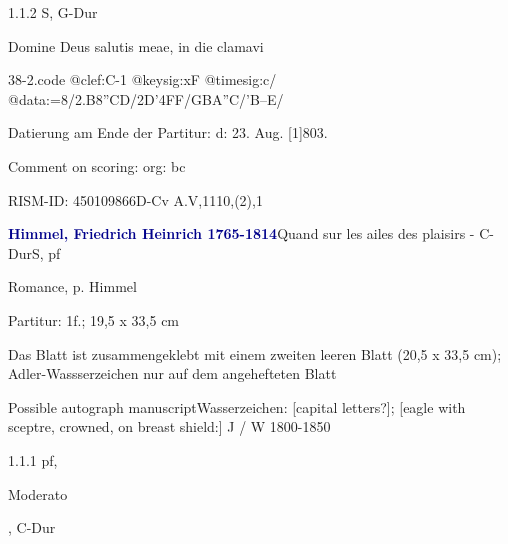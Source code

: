 \documentclass[a4paper, twocolumn, 11pt]{book}
\begin{document}
\newline %
\par 1.1.2  S, G-Dur\newline \begin{footnotesize} Domine Deus salutis meae, in die clamavi \end{footnotesize}  
\begin{filecontents*}{38-2.code}
@clef:C-1
@keysig:xF
@timesig:c/
@data:=8/2.B8''CD/2D'4FF/GBA''C/'B--E/
\end{filecontents*}
\newline %
\par Datierung am Ende der Partitur: {\textquotedbl}d: 23. Aug. [1]803.{\textquotedbl}
\par Comment on scoring: org: bc
\par RISM-ID: 450109866\newline D-Cv  A.V,1110,(2),1
\par \vspace{16pt} \textcolor{darkblue}{\textbf{Himmel, Friedrich Heinrich  1765-1814}}\hfillplus{[39]}\newline Quand sur les ailes des plaisirs - C-Dur\newline S, pf
\par \begin{itshape} Romance, p. Himmel\end{itshape} 
\par \textcolor{darkblue}{}  Partitur: 1f.; 19,5 x 33,5 cm\newline \begin{small} Das Blatt ist zusammengeklebt mit einem zweiten leeren Blatt (20,5 x 33,5 cm); Adler-Wassserzeichen nur auf dem angehefteten Blatt\end{small} \newline Possible autograph manuscript\newline Wasserzeichen: [capital letters?]; [eagle with sceptre, crowned, on breast shield:] J / W  1800-1850
\par 1.1.1  pf, \begin{itshape}Moderato\end{itshape}, C-Dur  
\begin{filecontents*}{39-1.code}
@clef:G-2
@keysig:
@timesig:c
@data:''2.C4-/'8-E-E-F-F/-E-E-{EG''C}/EEDC}{'BAGF}/
\end{filecontents*}
\end{document}

